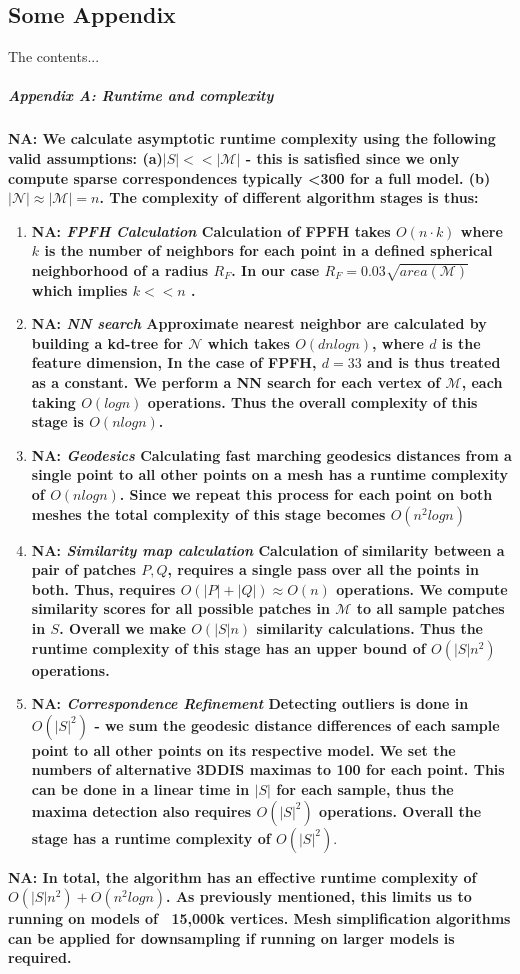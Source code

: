 \documentclass[10pt,twocolumn,letterpaper]{article}
\newcommand{\colornote}[3]{{\color{#1}\bf{#2: #3}\normalfont}}
\newcommand{\colornote}[3]{}
\newcommand {\nadav}[1]{\colornote{red}{NA}{#1}}
\begin{document}
\begin{appendices}
\chapter{Some Appendix}
The contents...
\end{appendices}
\paragraph{Appendix A: Runtime and complexity}
\label{app:Runtime}
\nadav{
	We calculate asymptotic runtime complexity using the following valid assumptions:
	(a)$|S|<<|\mathcal{M}|$ - this is satisfied since we only compute sparse correspondences typically <300 for a full model. 
	(b) $|\mathcal{N}|\approx |\mathcal{M}|=n$. 
	The complexity of different algorithm stages is thus:
}
\begin{enumerate}
	
	\item \nadav{\textit{FPFH Calculation} Calculation of FPFH takes $O(n \cdot k)$ where $k$ is the number of neighbors for each point in a defined spherical neighborhood of a radius $R_F$. In our case $R_F=0.03\sqrt{area(\mathcal{M})}$ which implies $k << n$ .
	}
	
	\item \nadav{\textit{NN search} Approximate nearest neighbor are calculated by building a kd-tree for $\mathcal{N}$ which takes $O(dnlogn)$, where $d$ is the feature dimension,
		In the case of FPFH, $d=33$ and is thus treated as a constant. 
		We perform a NN search for each vertex of $\mathcal{M}$, each taking $O(logn)$ operations. 
		Thus the overall complexity of this stage is $O(nlogn)$.}
	
	\item \nadav{\textit{Geodesics} Calculating fast marching geodesics distances from a single point to all other points on a mesh has a runtime complexity of $O(nlogn)$.
		Since we repeat this process for each point on both meshes the total complexity of this stage becomes $O(n^2logn)$}
	
	\item \nadav{\textit{Similarity map calculation} Calculation of similarity between a pair of patches $P,Q$, requires a single pass over all the points in both. 
		Thus, requires $O(|P|+|Q|)\approx O(n)$ operations. 
		We compute  similarity scores for all possible patches in $\mathcal{M}$ to all sample patches in $S$. 
		Overall we make $O(|S|n)$ similarity calculations. 
		Thus the runtime complexity of this stage has an upper bound of $O(|S|n^2)$ operations.}
	
	\item \nadav{\textit{Correspondence Refinement} 
		Detecting outliers is done in $O(|S|^2)$ - we sum the geodesic distance differences of each sample point to all other points on its respective model. 
		We set the numbers of alternative 3DDIS maximas to 100 for each point. This can be done in a linear time in $|S|$ for each sample, thus the maxima detection also requires $O(|S|^2)$ operations.
		Overall the stage has a runtime complexity of $O(|S|^2)$}.
	
\end{enumerate}
\nadav{In total, the algorithm has an effective runtime complexity of $O(|S|n^2) + O(n^2logn)$.
	As previously mentioned, this limits us to running on models of ~15,000k vertices. 
	Mesh simplification algorithms can be applied for downsampling if running on larger models is required.}
\end{document}
